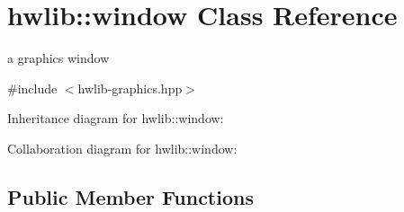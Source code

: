 \hypertarget{classhwlib_1_1window}{}\section{hwlib\+:\+:window Class Reference}
\label{classhwlib_1_1window}


a graphics window  




{\ttfamily \#include $<$hwlib-\/graphics.\+hpp$>$}



Inheritance diagram for hwlib\+:\+:window\+:


Collaboration diagram for hwlib\+:\+:window\+:
\subsection*{Public Member Functions}
